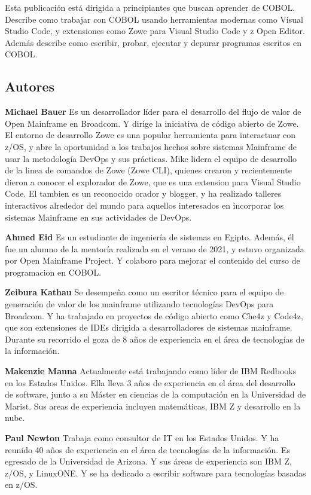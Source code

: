 Esta publicación está dirigida a principiantes que buscan aprender
de COBOL. Describe como trabajar con COBOL usando herramientas modernas
como Visual Studio Code, y extensiones como Zowe para Visual Studio Code
y z Open Editor. Además describe como escribir, probar, ejecutar y 
depurar programas escritos en COBOL.

\hypertarget{authors}{%
\subsection*{Autores}\label{authors}}

\textbf{Michael Bauer} Es un desarrollador líder para el desarrollo
del flujo de valor de Open Mainframe en Broadcom. Y dirige la iniciativa
de código abierto de Zowe. El entorno de desarrollo Zowe es una popular
herramienta para interactuar con z/OS, y abre la oportunidad a los 
trabajos hechos sobre sistemas Mainframe de usar la metodología DevOps
y sus prácticas. Mike lidera el equipo de desarrollo de la linea de comandos
de Zowe (Zowe CLI), quienes crearon y recientemente dieron a conocer el
explorador de Zowe, que es una extension para Visual Studio Code.
El tambien es un reconocido orador y blogger, y ha realizado talleres
interactivos alrededor del mundo para aquellos interesados en incorporar
los sistemas Mainframe en sus actividades de DevOps.

\textbf{Ahmed Eid} Es un estudiante de ingeniería de sistemas en Egipto.
Además, él fue un alumno de la mentoría realizada en el verano de 2021,
y estuvo organizada por Open Mainframe Project. 
Y colaboro para mejorar el contenido del curso de programacion en COBOL.

\textbf{Zeibura Kathau} Se desempeña como un escritor técnico para el equipo
de generación de valor de los mainframe utilizando tecnologías DevOps para Broadcom.
Y ha trabajado en proyectos de código abierto como Che4z y Code4z, que son extensiones
de IDEs dirigida a desarrolladores de sistemas mainframe. Durante su recorrido el goza
de 8 años de experiencia en el área de tecnologías de la información.

\textbf{Makenzie Manna} Actualmente está trabajando como líder de IBM Redbooks
en los Estados Unidos. Ella lleva 3 años de experiencia en el área del desarrollo
de software, junto a su Máster en ciencias de la computación en la Universidad de Marist.
Sus areas de experiencia incluyen matemáticas, IBM Z y desarrollo en la nube.

\textbf{Paul Newton} Trabaja como consultor de IT en los Estados Unidos.
Y ha reunido 40 años de experiencia en el área de tecnologías de la información.
Es egresado de la Universidad de Arizona. Y sus áreas de experiencia son IBM Z,
z/OS, y LinuxONE. Y se ha dedicado a escribir software para tecnologías basadas en
z/OS.

